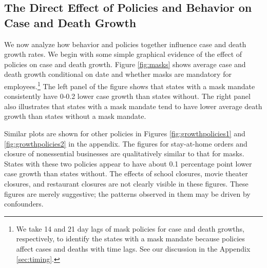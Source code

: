 \documentclass[11pt,reqno,letter]{amsart}
\theoremstyle{definition}
\begin{document}
\subsection{The Direct Effect of Policies and Behavior on Case
and Death Growth\label{policy-behavior-and-case-growth}}

We now analyze how behavior and policies together influence case and death
growth rates. We begin with some simple graphical evidence of the
effect of policies on case and death growth. Figure \ref{fig:masks}
shows average case and death growth conditional on date and whether
masks are mandatory for employees.\footnote{We take 14 and 21 day lags of mask policies for case and death growths, respectively, to  identify the states with a mask mandate because policies affect cases and deaths with time lags. See our discussion in the Appendix \ref{sec:timing}.} The   left panel of the figure shows that states with a mask mandate consistently have 0-0.2 lower case
growth than states without. The  right panel also illustrates that
states with a mask mandate tend to have lower average death growth than states without a mask mandate. 


Similar plots are shown for other policies in Figures
\ref{fig:growthpolicies1} and \ref{fig:growthpolicies2} in the
appendix. The  figures for stay-at-home orders and closure
of nonessential businesses are qualitatively similar to that for
masks. States with these two policies appear to have about 0.1 percentage point lower
case growth  than states without. The effects of school closures, movie theater closures, and
restaurant closures are not clearly visible in these figures. These
figures are merely suggestive; the patterns observed in them may be
driven by confounders.
\end{document}
